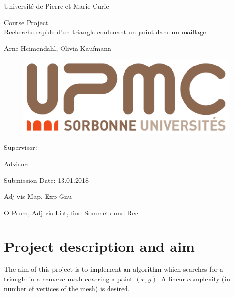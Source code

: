 \documentclass[10pt]{article}
\begin{document}
	
\begin{titlepage}
	\begin{center}
		\vspace{2cm}
		{\Large
			Université de Pierre et Marie Curie 
		}
		\normalsize
		
		Course Project\\[15mm]
		
		{\Huge
			Recherche rapide d’un triangle contenant un point dans un maillage
		}
		\vspace{2cm}
		
		\normalsize
		
		Arne Heimendahl, Olivia Kaufmann
		
		\begin{figure}[t]
			\includegraphics[scale=0.1]{UPMC_Sorbonne_Universites.png}
		\end{figure}
		
	\end{center}
	\vspace*{75mm}
	
	Supervisor: 
	\medskip
	
	Advisor: 
	\medskip
	
	Submission Date: 13.01.2018 
	
\end{titlepage}

\newpage
\tableofcontents
\newpage

	

Adj vis Map, Exp Gnu

O Prom, Adj vis List, find Sommets und Rec

\section{Project description and aim}

The aim of this project is to implement an algorithm which searches for a triangle in a convexe mesh covering a point $(x,y)$. A linear complexity (in number of vertices of the mesh) is desired.
\end{document}
